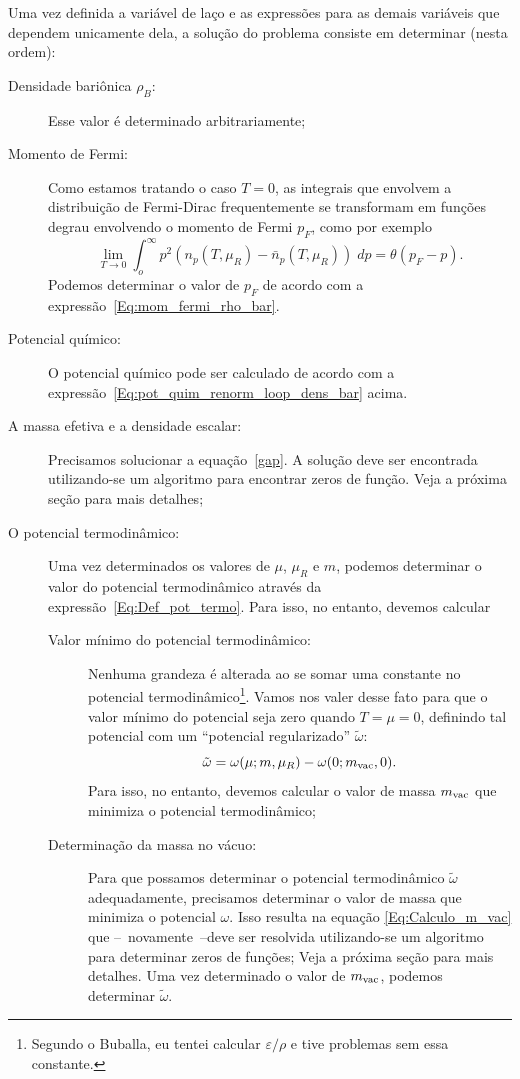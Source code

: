 Uma vez definida a variável de laço e as expressões para as demais variáveis que dependem unicamente dela, a solução do problema consiste em determinar (nesta ordem):
\begin{description}
	\item[Densidade bariônica $\rho_B$:] Esse valor é determinado arbitrariamente;
	\item[Momento de Fermi:] Como estamos tratando o caso $T = 0$, as integrais que envolvem a distribuição de Fermi-Dirac frequentemente se transformam em funções degrau envolvendo o momento de Fermi $p_F$, como por exemplo
		\begin{equation}
			\lim_{T \to 0} \int_o^\infty p^2 (n_p(T, \mu_R) - \bar{n}_p(T, \mu_R)) \;dp = \theta(p_F - p).
		\end{equation}
		Podemos determinar o valor de $p_F$ de acordo com a expressão~\eqref{Eq:mom_fermi_rho_bar}.
	\item[Potencial químico:] O potencial químico pode ser calculado de acordo com a expressão~\eqref{Eq:pot_quim_renorm_loop_dens_bar} acima.
	\item[A massa efetiva e a densidade escalar:] Precisamos solucionar a equação~\eqref{gap}. A solução deve ser encontrada utilizando-se um algoritmo para encontrar zeros de função. Veja a próxima seção para mais detalhes;
	\item[O potencial termodinâmico:] Uma vez determinados os valores de $\mu$, $\mu_R$ e $m$, podemos determinar o valor do potencial termodinâmico através da expressão~\eqref{Eq:Def_pot_termo}. Para isso, no entanto, devemos calcular
		\begin{description}
			\item[Valor mínimo do potencial termodinâmico:] Nenhuma grandeza é alterada ao se somar uma constante no potencial termodinâmico\footnote{Segundo o Buballa, eu tentei calcular $\varepsilon/\rho$ e tive problemas sem essa constante.}. Vamos nos valer desse fato para que o valor mínimo do potencial seja zero quando $T = \mu = 0$, definindo tal potencial com um ``potencial regularizado'' $\tilde\omega$:
							\begin{equation}
					\tilde\omega = \omega(\mu;m,\mu_R) - \omega(0;m_{\rm{vac}},0).
				\end{equation}
				Para isso, no entanto, devemos calcular o valor de massa $m_{\rm{vac}}$ que minimiza o potencial termodinâmico;
			\item[Determinação da massa no vácuo:] Para que possamos determinar o potencial termodinâmico $\tilde\omega$ adequadamente, precisamos determinar o valor de massa que minimiza o potencial $\omega$. Isso resulta na equação \ref{Eq:Calculo_m_vac} que --~novamente~--deve ser resolvida utilizando-se um algoritmo para determinar zeros de funções; Veja a próxima seção para mais detalhes. Uma vez determinado o valor de $m_{\rm{vac}}$, podemos determinar $\tilde\omega$.

\end{description}
\end{description}
